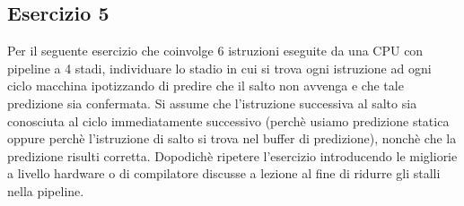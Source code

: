 \documentclass[a4paper]{article}
\theoremstyle{break}
\theoremstyle{break}
\theoremstyle{break}
\theoremstyle{break}
\begin{document}
\begin{table}[H]
  \centering
\end{table}

\subsection{Esercizio 5}
Per il seguente esercizio che coinvolge 6 istruzioni eseguite da una CPU con pipeline a 4 stadi, individuare lo stadio in cui si trova ogni istruzione ad ogni ciclo macchina ipotizzando di predire che il salto non avvenga e che tale predizione sia confermata. Si assume che l'istruzione successiva al salto sia conosciuta al ciclo immediatamente successivo (perchè usiamo predizione statica oppure perchè l'istruzione di salto si trova nel buffer di predizione), nonchè che la predizione risulti corretta.
Dopodichè ripetere l'esercizio introducendo le migliorie a livello hardware o di compilatore discusse a lezione al fine di ridurre gli stalli nella pipeline.
\end{document}
